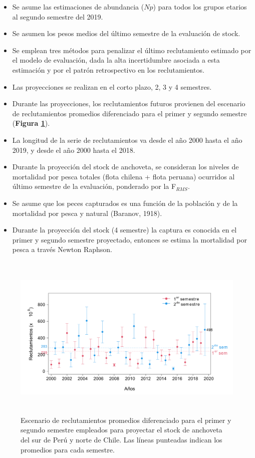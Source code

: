 \documentclass[letter,11pt]{article}
\begin{document}
\vspace{0.5cm}
\begin{itemize}
\item 
  Se asume las estimaciones de abundancia ($Np$) para todos los grupos etarios al segundo
  semestre del 2019.
\item
  Se asumen los pesos medios del \'ultimo semestre de la evaluaci\'on de stock.
\item
  Se emplean tres m\'etodos para penalizar el \'ultimo reclutamiento estimado por el
  modelo de evaluaci\'on, dada la alta incertidumbre asociada a esta estimaci\'on y por el 
  patr\'on retrospectivo en los reclutamientos.
\item
  Las proyecciones se realizan en el corto plazo, 2, 3 y 4 semestres.
\item
  Durante las proyecciones, los reclutamientos futuros provienen del
  escenario de reclutamientos promedios diferenciado para el primer y
  segundo semestre (\textbf{Figura \ref{Fig10}}).
\item
  La longitud de la serie de reclutamientos va desde el a\~{n}o 2000 hasta
  el a\~{n}o 2019, y desde el a\~{n}o 2000 hasta el 2018.
\item
  Durante la proyecci\'on del stock de anchoveta, se consideran los
  niveles de mortalidad por pesca totales (flota chilena + flota peruana) ocurridos al \'ultimo semestre
  de la evaluaci\'on, ponderado por la F$_{RMS}$.
\item
  Se asume que los peces capturados es una funci\'on de la poblaci\'on y de
  la mortalidad por pesca y natural (Baranov, 1918).
\item
  Durante la proyecci\'on del stock (4 semestre) la captura es conocida en el
  primer y segundo semestre proyectado, entonces se estima la mortalidad por pesca a trav\'es Newton
  Raphson.
\end{itemize}
\vspace{0.5cm}


\vspace{0.5cm}
\begin{figure}[htb!]
 \centering
 \includegraphics[width=15cm,height=8cm]{fig/figura10.pdf}
 \caption{Escenario de reclutamientos promedios diferenciado para el primer y segundo semestre empleados para proyectar el stock de anchoveta del sur de Per\'u y norte de Chile. Las l\'ineas punteadas indican los promedios para cada semestre.}
 \label{Fig10}
\end{figure}
\vspace{0.5cm}
\end{document}
